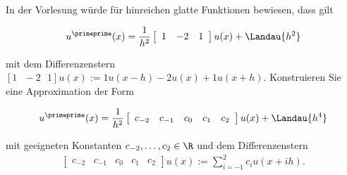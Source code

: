 \begin{exercise}
  In der Vorlesung würde für hinreichen glatte Funktionen bewiesen, dass gilt

  \begin{align*}
    u^\primeprime (x) = \frac{1}{h^2}\left[
    \begin{array}{ccc}
      1 & -2 & 1
    \end{array}
    \right] u(x) +
    \Landau{h^2}
  \end{align*}

  mit dem Differenzenstern $[1 \text{ }  -2 \text{ } 1]u(x):= 1u(x-h)-2u(x)+1u(x+h)$.
  Konstruieren Sie eine Approximation der Form

  \begin{align*}
    u^\primeprime (x) = \frac{1}{h^2} \left[
    \begin{array}{ccccc}
    c_{-2} & c_{-1} & c_0 & c_1 & c_ 2
    \end{array}
    \right]
    u(x) + \Landau{h^4}
  \end{align*}

  mit geeigneten Konstanten $c_{-2}, \dots , c_2 \in \R$ und dem Differenzenstern
  \begin{align*}
    \left[
    \begin{array}{ccccc}
        c_{-2} & c_{-1} & c_0 & c_1 & c_ 2
    \end{array}
    \right]
    u(x)
    :=
    \sum_{i=-1}^2 c_i u(x+ih).
  \end{align*}
\end{exercise}

